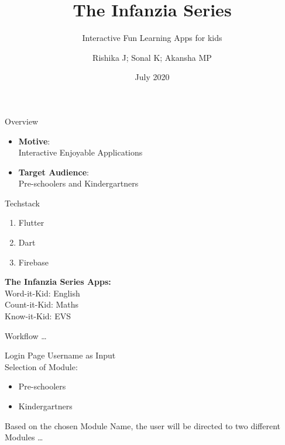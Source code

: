 \documentclass[14pt]{beamer}
\title[SlideSpeak]{The Infanzia Series}
\subtitle{Interactive Fun Learning Apps for kids}
\author[Team 16]{Rishika J; Sonal K; Akansha MP}
\date{July 2020}
\begin{document}
\begin{frame}
    \titlepage
\end{frame}

\begin{frame}{Overview}
    \pause
    \begin{itemize}
    \item \textbf{Motive}: \\
            Interactive Enjoyable Applications
        \pause
    \item \textbf{Target Audience}: \\
            Pre-schoolers and Kindergartners
    \end{itemize}
\end{frame}

\begin{frame}{Techstack}
    \pause
    \begin{enumerate}
        \item Flutter
        \item Dart
        \item Firebase  
    \end{enumerate}
\end{frame}

\begin{frame}
    \textbf{The Infanzia Series Apps:} \\ 
    \pause
    \alert{Word-it-Kid: English} \\
    \pause
    \alert{Count-it-Kid: Maths} \\
    \pause
    \alert{Know-it-Kid: EVS} 
\end{frame}

\begin{frame}[standout]
    \alert{Workflow \ldots}
\end{frame}

\begin{frame}{Login Page}
    \pause
    Username as Input \\
    \pause
    Selection of Module: \\
    \begin{itemize}
    	\item Pre-schoolers
        \item Kindergartners
    \end{itemize}
\end{frame}

\begin{frame}[standout]
    \alert{Based on the chosen Module Name, the user will be directed to two different Modules \ldots}
\end{frame}
\end{document}
